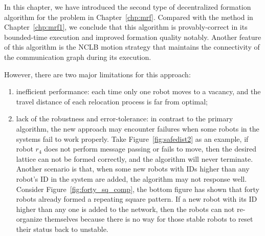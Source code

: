 In this chapter, we have introduced the second type of decentralized formation algorithm for the problem in Chapter~\ref{chp:mrf}.
%
Compared with the method in Chapter~\ref{chp:mrf1}, we conclude that this algorithm is provably-correct in its bounded-time execution and improved formation quality notably.
%
Another feature of this algorithm is the NCLB motion strategy that maintains the connectivity of the communication graph during its execution.



However, there are two major limitations for this approach:
\begin{enumerate}
\item inefficient performance: each time only one robot moves to a vacancy, and the travel distance of each relocation process is far from optimal;
\item lack of the robustness and error-tolerance: in contrast to the primary algorithm, the new approach may encounter failures when some robots in the systems fail to work properly. Take Figure~\ref{fig:safedist2} as an example, if robot $r_4$ does not perform message passing or fails to move, then the desired lattice can not be formed correctly, and the algorithm will never terminate. 
Another scenario is that, when some new robots with IDs higher than any robot's ID in the system are added, the algorithm may not response well. Consider Figure~\ref{fig:forty_sq_comp}, the bottom figure has shown that forty robots already formed a repeating square pattern. If a new robot with its ID higher than any one is added to the network, then the robots can not re-organize themselves because there is no way for those stable robots to reset their status back to unstable.
\end{enumerate}




